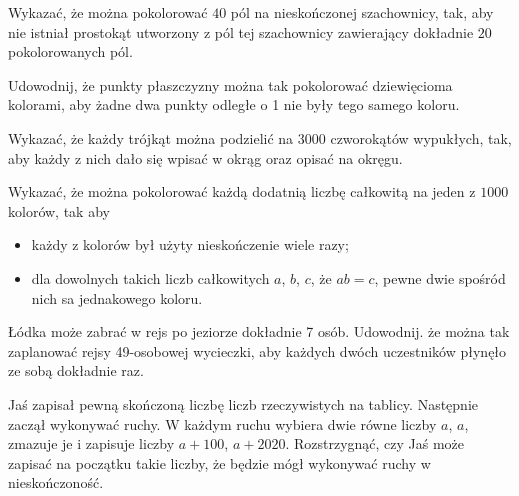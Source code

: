 \begin{problem}{1} 
	Wykazać, że można pokolorować $40$ pól na nieskończonej szachownicy, tak, aby nie istniał prostokąt utworzony z pól tej szachownicy zawierający dokładnie $20$ pokolorowanych pól.
\end{problem}

\begin{problem}{2} 
	Udowodnij, że punkty płaszczyzny można tak pokolorować dziewięcioma kolorami, aby żadne dwa punkty odległe o 1 nie były tego samego koloru.
\end{problem}

\begin{problem}{3}
	Wykazać, że każdy trójkąt można podzielić na $3000$ czworokątów wypukłych, tak, aby każdy z nich dało się wpisać w okrąg oraz opisać na okręgu.
\end{problem}

\begin{problem}{4} 
	Wykazać, że można pokolorować każdą dodatnią liczbę całkowitą na jeden z $1000$ kolorów, tak aby
	\begin{itemize}
		\item każdy z kolorów był użyty nieskończenie wiele razy;
		\item dla dowolnych takich liczb całkowitych $a$, $b$, $c$, że $ab = c$, pewne dwie spośród nich sa jednakowego koloru.
	\end{itemize} 
\end{problem}

\begin{problem}{5}
	Łódka może zabrać w rejs po jeziorze dokładnie 7 osób. Udowodnij. że można tak zaplanować rejsy 49-osobowej wycieczki, aby każdych dwóch uczestników płynęło ze sobą dokładnie raz.
\end{problem}

\begin{problem}{6}
	Jaś zapisał pewną skończoną liczbę liczb rzeczywistych na tablicy. Następnie zaczął wykonywać ruchy. W każdym ruchu wybiera dwie równe liczby $a$, $a$, zmazuje je i zapisuje liczby $a + 100$, $a + 2020$. Rozstrzygnąć, czy Jaś może zapisać na początku takie liczby, że będzie mógł wykonywać ruchy w nieskończoność.
\end{problem}

